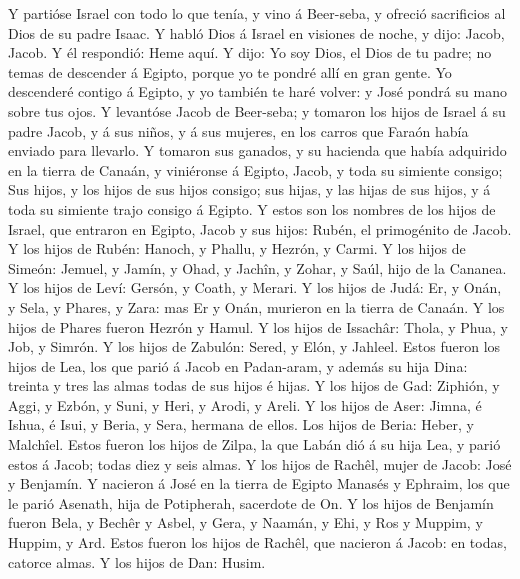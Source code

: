  Y partióse Israel con todo lo que tenía, y vino á
Beer-seba, y ofreció sacrificios al Dios de su padre Isaac. 
Y habló Dios á Israel en visiones de noche, y dijo: Jacob, Jacob. Y él
respondió: Heme aquí.  Y dijo: Yo soy Dios, el Dios de tu
padre; no temas de descender á Egipto, porque yo te pondré allí en gran
gente.  Yo descenderé contigo á Egipto, y yo también te haré
volver: y José pondrá su mano sobre tus ojos.  Y levantóse
Jacob de Beer-seba; y tomaron los hijos de Israel á su padre Jacob, y á
sus niños, y á sus mujeres, en los carros que Faraón había enviado para
llevarlo.  Y tomaron sus ganados, y su hacienda que había
adquirido en la tierra de Canaán, y viniéronse á Egipto, Jacob, y toda
su simiente consigo;  Sus hijos, y los hijos de sus hijos
consigo; sus hijas, y las hijas de sus hijos, y á toda su simiente trajo
consigo á Egipto.  Y estos son los nombres de los hijos de
Israel, que entraron en Egipto, Jacob y sus hijos: Rubén, el primogénito
de Jacob.  Y los hijos de Rubén: Hanoch, y Phallu, y Hezrón,
y Carmi.  Y los hijos de Simeón: Jemuel, y Jamín, y Ohad, y
Jachîn, y Zohar, y Saúl, hijo de la Cananea.  Y los hijos
de Leví: Gersón, y Coath, y Merari.  Y los hijos de Judá:
Er, y Onán, y Sela, y Phares, y Zara: mas Er y Onán, murieron en la
tierra de Canaán. Y los hijos de Phares fueron Hezrón y Hamul.
 Y los hijos de Issachâr: Thola, y Phua, y Job, y Simrón.
 Y los hijos de Zabulón: Sered, y Elón, y Jahleel.
 Estos fueron los hijos de Lea, los que parió á Jacob en
Padan-aram, y además su hija Dina: treinta y tres las almas todas de sus
hijos é hijas.  Y los hijos de Gad: Ziphión, y Aggi, y
Ezbón, y Suni, y Heri, y Arodi, y Areli.  Y los hijos de
Aser: Jimna, é Ishua, é Isui, y Beria, y Sera, hermana de ellos. Los
hijos de Beria: Heber, y Malchîel.  Estos fueron los hijos
de Zilpa, la que Labán dió á su hija Lea, y parió estos á Jacob; todas
diez y seis almas.  Y los hijos de Rachêl, mujer de Jacob:
José y Benjamín.  Y nacieron á José en la tierra de Egipto
Manasés y Ephraim, los que le parió Asenath, hija de Potipherah,
sacerdote de On.  Y los hijos de Benjamín fueron Bela, y
Bechêr y Asbel, y Gera, y Naamán, y Ehi, y Ros y Muppim, y Huppim, y
Ard.  Estos fueron los hijos de Rachêl, que nacieron á
Jacob: en todas, catorce almas.  Y los hijos de Dan: Husim.
